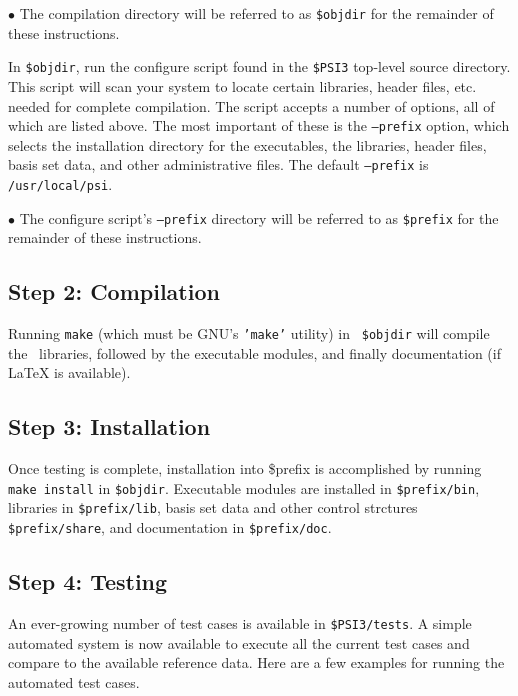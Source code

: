 \documentclass[12pt]{article}
\begin{document}
$\bullet$ The compilation directory will be referred to as {\tt \$objdir}
for the remainder of these instructions.

In {\tt \$objdir}, run the configure script found in the {\tt \$PSI3}
top-level source directory.  This script will scan your system to locate
certain libraries, header files, etc. needed for complete compilation.
The script accepts a number of options, all of which are listed above.
The most important of these is the {\tt --prefix} option, which selects the
installation directory for the executables, the libraries, header files,
basis set data, and other administrative files.  The default {\tt --prefix}
is {\tt /usr/local/psi}.

$\bullet$ The configure script's {\tt --prefix} directory will be referred
to as {\tt \$prefix} for the remainder of these instructions.

\subsection{Step 2: Compilation}

Running {\tt make} (which must be GNU's {\tt 'make'} utility) in {\tt
\$objdir} will compile the \PSIthree\ libraries, followed by the executable
modules, and finally documentation (if LaTeX is available).

\subsection{Step 3: Installation}

Once testing is complete, installation into \$prefix is accomplished by
running {\tt make install} in {\tt \$objdir}.   Executable modules are
installed in {\tt \$prefix/bin}, libraries in {\tt \$prefix/lib}, basis set
data and other control strctures {\tt \$prefix/share}, and documentation
in {\tt \$prefix/doc}.

\subsection{Step 4: Testing}

An ever-growing number of test cases is available in {\tt \$PSI3/tests}.
A simple automated system is now available to execute all the current test
cases and compare to the available reference data. Here are a few 
examples for running the automated test cases.
\end{document}
